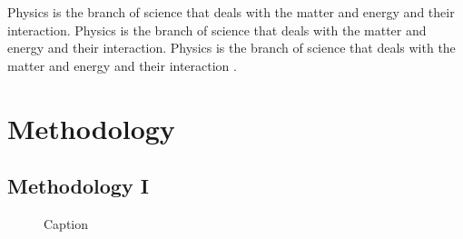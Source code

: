 \documentclass[10pt]{article}
\begin{document}
\begin{tcolorbox}[title = Definition of Physics, skin=standard jigsaw, sharp corners, colback=blue!10, colframe=blue!50, boxrule=0pt]
    Physics is the branch of science that deals with the matter and energy and their interaction. Physics is the branch of science that deals with the matter and energy and their interaction. Physics is the branch of science that deals with the matter and energy and their interaction \cite{arpagaus2018high}.
\end{tcolorbox}










\newpage
\section{Methodology}







\subsection{Methodology I}

\begin{figure}[H]
    \centering
    
    \caption{Caption}
    \label{fig:enter-label}
\end{figure}
\end{document}
